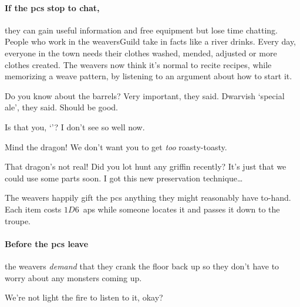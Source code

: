 \begin{multicols}{2}
\paragraph{If the \glspl{pc} stop to chat,}
they can gain useful information and free \gls{equipment} but lose time chatting.
People who work in the \gls{weaversGuild} take in facts like a river drinks.
Every day, everyone in the town needs their clothes washed, mended, adjusted or more clothes created.
The \glspl{weaver} now think it's normal to recite recipes, while memorizing a weave pattern, by listening to an argument about how to start it.

\begin{speechtext}

  Do you know about the barrels?
  Very important, they said.
  Dwarvish `special ale', they said.
  Should be good.

  {\small
    Is that you, `\composeHumanName'?
    I don't see so well now.
  }

  \vspace{-.5em}
  {\large
    Mind the dragon!
    We don't want you to get \emph{too} roasty-toasty.
  }

  That dragon's not real!
  Did you lot hunt any \gls{griffin} recently?
  It's just that we could use some parts soon.
  I got this new preservation technique\ldots

  \vspace{-.3em}
\end{speechtext}

The \glspl{weaver} happily gift the \glspl{pc} anything they might reasonably have to-hand.
Each item costs $1D6$~\glspl{ap} while someone locates it and passes it down to the troupe.

\paragraph{Before the \glspl{pc} leave}
the \glspl{weaver} \emph{demand} that they crank the floor back up so they don't have to worry about any \glspl{monster} coming up.

\begin{speechtext}
  We're not light the fire to listen to it, okay?

  \vspace{-.4em}


\end{speechtext}
\end{multicols}
